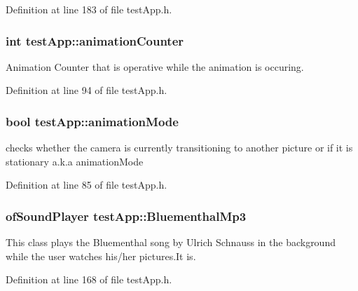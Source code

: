 Definition at line 183 of file test\-App.\-h.

\hypertarget{classtest_app_a21b16bdba744425519597fcb925df43a}{
\subsubsection[{animation\-Counter}]{\setlength{\rightskip}{0pt plus 5cm}int test\-App\-::animation\-Counter}}\label{classtest_app_a21b16bdba744425519597fcb925df43a}


Animation Counter that is operative while the animation is occuring. 



Definition at line 94 of file test\-App.\-h.

\hypertarget{classtest_app_a2a5d49fd1f7f50f745f56095a1fa0099}{
\subsubsection[{animation\-Mode}]{\setlength{\rightskip}{0pt plus 5cm}bool test\-App\-::animation\-Mode}}\label{classtest_app_a2a5d49fd1f7f50f745f56095a1fa0099}


checks whether the camera is currently transitioning to another picture or if it is stationary a.\-k.\-a animation\-Mode 



Definition at line 85 of file test\-App.\-h.

\hypertarget{classtest_app_af696fd13ee9ecb38ac0ba0b72543ce06}{
\subsubsection[{Bluementhal\-Mp3}]{\setlength{\rightskip}{0pt plus 5cm}of\-Sound\-Player test\-App\-::\-Bluementhal\-Mp3}}\label{classtest_app_af696fd13ee9ecb38ac0ba0b72543ce06}


This class plays the Bluementhal song by Ulrich Schnauss in the background while the user watches his/her pictures.\-It is. 



Definition at line 168 of file test\-App.\-h.

